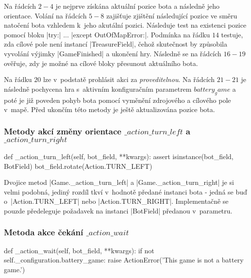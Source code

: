 {Na řádcích $2-4$ je nejprve získána aktuální pozice bota a následně jeho orientace. Volání na řádcích $5-8$ zajišťuje zjištění následující pozice ve směru natočení bota vzhledem k~jeho akutální pozici. Následuje test na existenci pozice pomocí bloku \ic|try:| $...$ \ic|except OutOfMapError:|. Podmínka na řádku $14$ testuje, zda cílové pole není instancí \ic|TreasureField|, čehož skutečnost by způsobila vyvolání výjimky \ic|GameFinished| a ukončení hry. Následně se na řádcích $16-19$ ověřuje, zdy je možné na cílové bloky přesunout aktuálního bota.

Na řádku $20$ lze v~podstatě prohlásit akci za \emph{proveditelnou}. Na řádcích $21-21$ je následně pochycena hra s~aktivním konfiguračním parametrem $battery_game$ a poté je již poveden pohyb bota pomocí vyměnění zdrojového a cílového pole v~mapě. Před ukončím této metody je ještě aktualizována pozice bota.

\subsubsection[Metody akcí změny orientace]{Metody akcí změny orientace $\_action\_turn\_left$ a $\_action\_turn\_right$}
\label{subsubsec:method-action-turn-left}
\label{subsubsec:method-action-turn-right}

\begin{code}[caption={Metoda $Game.\_action\_turn\_left$},label={lst:game-action-turn-left}]
def _action_turn_left(self, bot_field, **kwargs):
    assert isinstance(bot_field, BotField)
    bot_field.rotate(Action.TURN_LEFT)
\end{code}

Dvojice metod \ic|Game._action_turn_left| a \ic|Game._action_turn_right| je si velmi podobná, jediný rozdíl tkví v~hodnotě předané instanci bota - jedná se buď o~\ic|Action.TURN_LEFT| nebo \ic|Action.TURN_RIGHT|. Implementačně se pouzde předeleguje požadavek na instanci \ic|BotField| předanou v~parametru.

\subsubsection{Metoda akce čekání $\_action\_wait$}
\label{subsubsec:method-action-wait}

\begin{code}[caption={Metoda $Game.\_action\_wait$},label={lst:game-action-wait}]
def _action_wait(self, bot_field, **kwargs):
    if not self._configuration.battery_game:
        raise ActionError('This game is not a battery game.')


\end{code}}

